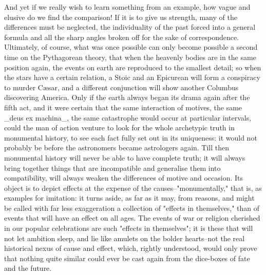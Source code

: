 And yet if we really wish to learn something from an example, how
vague and elusive do we find the comparison! If it is to give us
strength, many of the differences must be neglected, the
individuality of the past forced into a general formula and all the
sharp angles broken off for the sake of correspondence. Ultimately,
of course, what was once possible can only become possible a second
time on the Pythagorean theory, that when the heavenly bodies are in
the same position again, the events on earth are reproduced to the
smallest detail; so when the stars have a certain relation, a Stoic
and an Epicurean will form a conspiracy to murder Cæsar, and a
different conjunction will show another Columbus discovering America.
Only if the earth always began its drama again after the fifth act,
and it were certain that the same interaction of motives, the same
_deus ex machina_, the same catastrophe would occur at particular
intervals, could the man of action venture to look for the whole
archetypic truth in monumental history, to see each fact fully set
out in its uniqueness: it would not probably be before the
astronomers became astrologers again. Till then monumental history
will never be able to have complete truth; it will always bring
together things that are incompatible and generalise them into
compatibility, will always weaken the differences of motive and
occasion. Its object is to depict effects at the expense of the
causes--"monumentally," that is, as examples for imitation: it turns
aside, as far as it may, from reasons, and might be called with far
less exaggeration a collection of "effects in themselves," than of
events that will have an effect on all ages. The events of war or
religion cherished in our popular celebrations are such "effects in
themselves"; it is these that will not let ambition sleep, and lie
like amulets on the bolder hearts--not the real historical nexus of
cause and effect, which, rightly understood, would only prove that
nothing quite similar could ever be cast again from the dice-boxes of
fate and the future.

